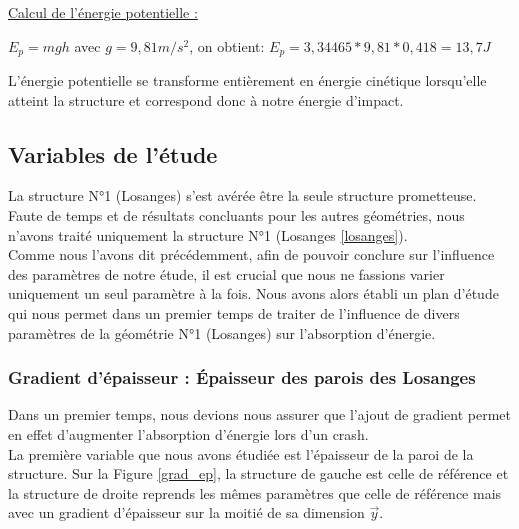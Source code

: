 \documentclass[a4paper]{article}
\begin{document}
	\underline{Calcul de l'énergie potentielle :}\\
	\label{energie_impact}
	\begin{center}
		$E_{p} = mgh$ avec $g = 9,81 m/s^{2}$, on obtient: $E_{p} = 3,34465 * 9,81 * 0,418 = 13,7 J$
	\end{center}

	L'énergie potentielle se transforme entièrement en énergie cinétique lorsqu'elle atteint la structure et correspond donc à notre énergie d'impact.
	\newpage
	
	\subsection{Variables de l'étude}
	\label{variables_etude}
	\hspace{0.5cm}La structure N°1 (Losanges) s'est avérée être la seule structure prometteuse. Faute de temps et de résultats concluants pour les autres géométries, nous n’avons traité uniquement la structure N°1 (Losanges \ref{losanges}).\\
		
	Comme nous l’avons dit précédemment, afin de pouvoir conclure sur l’influence des paramètres de notre étude, il est crucial que nous ne fassions varier uniquement un seul paramètre à la fois. Nous avons alors établi un plan d’étude qui nous permet dans un premier temps de traiter de l’influence de divers paramètres de la géométrie N°1 (Losanges) sur l’absorption d’énergie.\\
	
	\subsubsection{Gradient d'épaisseur : Épaisseur des parois des Losanges}
	\label{grad_ep_partie}
	\hspace{0.5cm}Dans un premier temps, nous devions nous assurer que l'ajout de gradient permet en effet d'augmenter l'absorption d'énergie lors d'un crash.\\
	
	La première variable que nous avons étudiée est l'épaisseur de la paroi de la structure. Sur la Figure \ref{grad_ep}, la structure de gauche est celle de référence et la structure de droite reprends les mêmes paramètres que celle de référence mais avec un gradient d'épaisseur sur la moitié de sa dimension $\vec{y}$.
	
\end{document}
